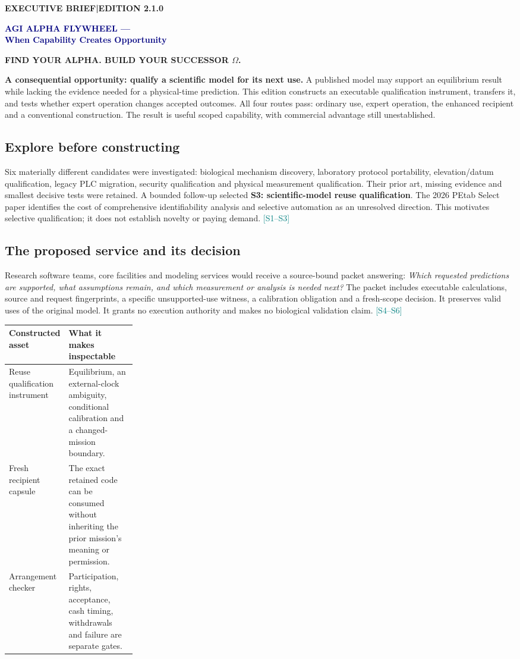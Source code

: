 \documentclass[11pt,letterpaper]{article}
\newcommand{\src}[1]{\textcolor{Teal}{\scriptsize[#1]}}
\newcommand{\keybox}[1]{\par\smallskip\noindent\begingroup\setlength{\fboxsep}{9pt}\colorbox{Pale}{\parbox{\dimexpr\linewidth-18pt\relax}{#1}}\endgroup\par\smallskip}
\newcommand{\eyebrow}[1]{{\small\bfseries\color{Gold}\MakeUppercase{#1}}\par}
\newcommand{\fulltitle}{\textcolor{Navy}{\LARGE\bfseries AGI ALPHA FLYWHEEL ---\\[3pt]When Capability Creates Opportunity}\par\vspace{5pt}{\large Transformational Intelligence, Experience-Trained Specialists\\and the Expanding Frontier of Profitable Work}\par\vspace{5pt}{\normalsize\bfseries Vincent Boucher --- President of MONTREAL.AI}\par}
\begin{document}
\eyebrow{Executive brief\enspace |\enspace Edition 2.1.0}
\fulltitle
\vspace{3pt}
{\small\bfseries\color{Gold}FIND YOUR ALPHA. BUILD YOUR SUCCESSOR $\Omega$.}

\keybox{\textbf{A consequential opportunity: qualify a scientific model for its next use.} A published model may support an equilibrium result while lacking the evidence needed for a physical-time prediction. This edition constructs an executable qualification instrument, transfers it, and tests whether expert operation changes accepted outcomes. All four routes pass: ordinary use, expert operation, the enhanced recipient and a conventional construction. The result is useful scoped capability, with commercial advantage still unestablished.}

\subsection*{Explore before constructing}
Six materially different candidates were investigated: biological mechanism discovery, laboratory protocol portability, elevation/datum qualification, legacy PLC migration, security qualification and physical measurement qualification. Their prior art, missing evidence and smallest decisive tests were retained. A bounded follow-up selected \textbf{S3: scientific-model reuse qualification}. The 2026 PEtab Select paper identifies the cost of comprehensive identifiability analysis and selective automation as an unresolved direction. This motivates selective qualification; it does not establish novelty or paying demand. \src{S1--S3}

\subsection*{The proposed service and its decision}
Research software teams, core facilities and modeling services would receive a source-bound packet answering: \emph{Which requested predictions are supported, what assumptions remain, and which measurement or analysis is needed next?} The packet includes executable calculations, source and request fingerprints, a specific unsupported-use witness, a calibration obligation and a fresh-scope decision. It preserves valid uses of the original model. It grants no execution authority and makes no biological validation claim. \src{S4--S6}

\begin{tabularx}{\linewidth}{@{}L{0.25\linewidth}Y@{}}
\toprule
\textbf{Constructed asset} & \textbf{What it makes inspectable} \\
\midrule
Reuse qualification instrument & Equilibrium, an external-clock ambiguity, conditional calibration and a changed-mission boundary. \\
Fresh recipient capsule & The exact retained code can be consumed without inheriting the prior mission's meaning or permission. \\
Arrangement checker & Participation, rights, acceptance, cash timing, withdrawals and failure are separate gates. \\
\bottomrule
\end{tabularx}
\end{document}
